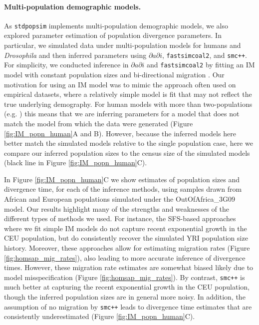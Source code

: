\documentclass[12pt,halfline,a4paper]{ouparticle}
\newcommand{\dadi}{$\partial a \partial i$\xspace}
\newcommand{\smcpp}{\texttt{smc++}\xspace}
\newcommand{\fastsimcoal}{\texttt{fastsimcoal2}\xspace}
\begin{document}
\paragraph*{Multi-population demographic models.}
As \texttt{stdpopsim} implements multi-population demographic models, we also
explored parameter estimation of population divergence parameters. In particular,
we simulated data under multi-population models for humans and \emph{Drosophila}
and then inferred  parameters using \dadi, \fastsimcoal, and \smcpp.
For simplicity, we conducted inference in \dadi and \fastsimcoal by fitting an IM model
with constant population sizes and bi-directional migration \citep{hey2004im}. Our motivation for using
an IM model was to mimic the approach often used on empirical datasets, where a relatively
simple model is fit that may not reflect the true underlying demography.
For human models with more than two-populations (e.g. \cite{gutenkunst2009inferring})
this means that we are inferring parameters for a model that does
not match the model from which the data were generated (Figure
\ref{fig:IM_popn_human}A and B). However, because the inferred models here better
match the simulated models relative to the single population case, here we compare
our inferred population sizes to the census size of the simulated models (black line in
Figure \ref{fig:IM_popn_human}C).

In Figure \ref{fig:IM_popn_human}C we show estimates of population sizes and divergence
time, for each of the inference methods, using samples drawn from African and European populations
simulated under the OutOfAfrica\_3G09 model. Our results highlight many
of the strengths and weaknesses of the different types of methods we used.
For instance, the SFS-based approaches where we fit simple IM models do not capture
recent exponential growth in the CEU population, but do consistently recover the
simulated YRI population size history. Moreover, these approaches allow for estimating
migration rates (Figure \ref{fig:homsap_mig_rates}), also leading to more accurate inference
of divergence times. However, these migration rate estimates are somewhat biased likely
due to model misspecification (Figure \ref{fig:homsap_mig_rates}).
By contrast, \smcpp is much better at capturing the recent exponential
growth in the CEU population, though the inferred population sizes are in general more
noisy. In addition, the assumption of no migration by \smcpp leads to divergence time
estimates that are consistently underestimated (Figure \ref{fig:IM_popn_human}C).
\end{document}
